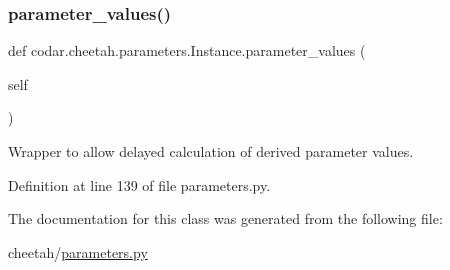 \subsubsection{\texorpdfstring{parameter\+\_\+values()}{parameter\_values()}}
{\footnotesize\ttfamily def codar.\+cheetah.\+parameters.\+Instance.\+parameter\+\_\+values (\begin{DoxyParamCaption}\item[{}]{self }\end{DoxyParamCaption})}

\begin{DoxyVerb}Wrapper to allow delayed calculation of derived parameter values.\end{DoxyVerb}
 

Definition at line 139 of file parameters.\+py.



The documentation for this class was generated from the following file\+:\begin{DoxyCompactItemize}
\item 
cheetah/\hyperlink{parameters_8py}{parameters.\+py}\end{DoxyCompactItemize}
